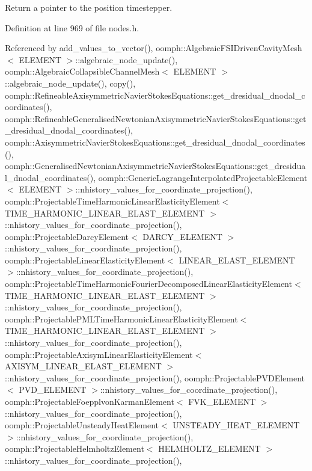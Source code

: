 Return a pointer to the position timestepper. 



Definition at line 969 of file nodes.\+h.



Referenced by add\+\_\+values\+\_\+to\+\_\+vector(), oomph\+::\+Algebraic\+F\+S\+I\+Driven\+Cavity\+Mesh$<$ E\+L\+E\+M\+E\+N\+T $>$\+::algebraic\+\_\+node\+\_\+update(), oomph\+::\+Algebraic\+Collapsible\+Channel\+Mesh$<$ E\+L\+E\+M\+E\+N\+T $>$\+::algebraic\+\_\+node\+\_\+update(), copy(), oomph\+::\+Refineable\+Axisymmetric\+Navier\+Stokes\+Equations\+::get\+\_\+dresidual\+\_\+dnodal\+\_\+coordinates(), oomph\+::\+Refineable\+Generalised\+Newtonian\+Axisymmetric\+Navier\+Stokes\+Equations\+::get\+\_\+dresidual\+\_\+dnodal\+\_\+coordinates(), oomph\+::\+Axisymmetric\+Navier\+Stokes\+Equations\+::get\+\_\+dresidual\+\_\+dnodal\+\_\+coordinates(), oomph\+::\+Generalised\+Newtonian\+Axisymmetric\+Navier\+Stokes\+Equations\+::get\+\_\+dresidual\+\_\+dnodal\+\_\+coordinates(), oomph\+::\+Generic\+Lagrange\+Interpolated\+Projectable\+Element$<$ E\+L\+E\+M\+E\+N\+T $>$\+::nhistory\+\_\+values\+\_\+for\+\_\+coordinate\+\_\+projection(), oomph\+::\+Projectable\+Time\+Harmonic\+Linear\+Elasticity\+Element$<$ T\+I\+M\+E\+\_\+\+H\+A\+R\+M\+O\+N\+I\+C\+\_\+\+L\+I\+N\+E\+A\+R\+\_\+\+E\+L\+A\+S\+T\+\_\+\+E\+L\+E\+M\+E\+N\+T $>$\+::nhistory\+\_\+values\+\_\+for\+\_\+coordinate\+\_\+projection(), oomph\+::\+Projectable\+Darcy\+Element$<$ D\+A\+R\+C\+Y\+\_\+\+E\+L\+E\+M\+E\+N\+T $>$\+::nhistory\+\_\+values\+\_\+for\+\_\+coordinate\+\_\+projection(), oomph\+::\+Projectable\+Linear\+Elasticity\+Element$<$ L\+I\+N\+E\+A\+R\+\_\+\+E\+L\+A\+S\+T\+\_\+\+E\+L\+E\+M\+E\+N\+T $>$\+::nhistory\+\_\+values\+\_\+for\+\_\+coordinate\+\_\+projection(), oomph\+::\+Projectable\+Time\+Harmonic\+Fourier\+Decomposed\+Linear\+Elasticity\+Element$<$ T\+I\+M\+E\+\_\+\+H\+A\+R\+M\+O\+N\+I\+C\+\_\+\+L\+I\+N\+E\+A\+R\+\_\+\+E\+L\+A\+S\+T\+\_\+\+E\+L\+E\+M\+E\+N\+T $>$\+::nhistory\+\_\+values\+\_\+for\+\_\+coordinate\+\_\+projection(), oomph\+::\+Projectable\+P\+M\+L\+Time\+Harmonic\+Linear\+Elasticity\+Element$<$ T\+I\+M\+E\+\_\+\+H\+A\+R\+M\+O\+N\+I\+C\+\_\+\+L\+I\+N\+E\+A\+R\+\_\+\+E\+L\+A\+S\+T\+\_\+\+E\+L\+E\+M\+E\+N\+T $>$\+::nhistory\+\_\+values\+\_\+for\+\_\+coordinate\+\_\+projection(), oomph\+::\+Projectable\+Axisym\+Linear\+Elasticity\+Element$<$ A\+X\+I\+S\+Y\+M\+\_\+\+L\+I\+N\+E\+A\+R\+\_\+\+E\+L\+A\+S\+T\+\_\+\+E\+L\+E\+M\+E\+N\+T $>$\+::nhistory\+\_\+values\+\_\+for\+\_\+coordinate\+\_\+projection(), oomph\+::\+Projectable\+P\+V\+D\+Element$<$ P\+V\+D\+\_\+\+E\+L\+E\+M\+E\+N\+T $>$\+::nhistory\+\_\+values\+\_\+for\+\_\+coordinate\+\_\+projection(), oomph\+::\+Projectable\+Foepplvon\+Karman\+Element$<$ F\+V\+K\+\_\+\+E\+L\+E\+M\+E\+N\+T $>$\+::nhistory\+\_\+values\+\_\+for\+\_\+coordinate\+\_\+projection(), oomph\+::\+Projectable\+Unsteady\+Heat\+Element$<$ U\+N\+S\+T\+E\+A\+D\+Y\+\_\+\+H\+E\+A\+T\+\_\+\+E\+L\+E\+M\+E\+N\+T $>$\+::nhistory\+\_\+values\+\_\+for\+\_\+coordinate\+\_\+projection(), oomph\+::\+Projectable\+Helmholtz\+Element$<$ H\+E\+L\+M\+H\+O\+L\+T\+Z\+\_\+\+E\+L\+E\+M\+E\+N\+T $>$\+::nhistory\+\_\+values\+\_\+for\+\_\+coordinate\+\_\+projection(), 